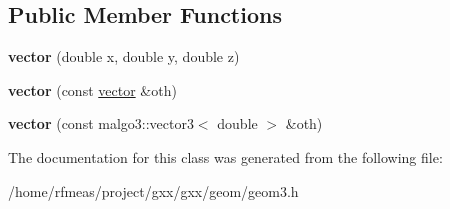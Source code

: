 \subsection*{Public Member Functions}
\begin{DoxyCompactItemize}
\item 
{\bfseries vector} (double x, double y, double z)\hypertarget{classgxx_1_1geom3_1_1vector_a130f4e610124fbdd9d62a078cdfabab4}{}\label{classgxx_1_1geom3_1_1vector_a130f4e610124fbdd9d62a078cdfabab4}

\item 
{\bfseries vector} (const \hyperlink{classgxx_1_1geom3_1_1vector}{vector} \&oth)\hypertarget{classgxx_1_1geom3_1_1vector_aa9e057b0e09682fd2b6950c021918a68}{}\label{classgxx_1_1geom3_1_1vector_aa9e057b0e09682fd2b6950c021918a68}

\item 
{\bfseries vector} (const malgo3\+::vector3$<$ double $>$ \&oth)\hypertarget{classgxx_1_1geom3_1_1vector_a1bb16669241163931f886395db6eaeb7}{}\label{classgxx_1_1geom3_1_1vector_a1bb16669241163931f886395db6eaeb7}

\end{DoxyCompactItemize}


The documentation for this class was generated from the following file\+:\begin{DoxyCompactItemize}
\item 
/home/rfmeas/project/gxx/gxx/geom/geom3.\+h\end{DoxyCompactItemize}
